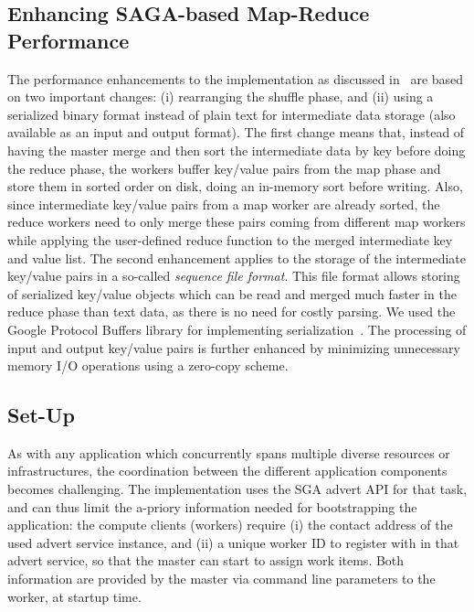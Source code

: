 \documentclass[3p,twocolumn]{elsarticle}
\begin{document}
\subsection{Enhancing SAGA-based Map-Reduce Performance}

The performance enhancements to the \sagamapreduce implementation as
discussed in~\cite{saga_ccgrid09} are based on two important changes:
(i) rearranging the shuffle phase, and (ii) using a serialized binary
format instead of plain text for intermediate data storage (also
available as an input and output format).  The first change means
that, instead of having the master merge and then sort the
intermediate data by key before doing the reduce phase, the workers
buffer key/value pairs from the map phase and store them in sorted
order on disk, doing an in-memory sort before writing. Also, since
intermediate key/value pairs from a map worker are already sorted, the
reduce workers need to only merge these pairs coming from different
map workers while applying the user-defined reduce function to the
merged intermediate key and value list.  The second enhancement
applies to the storage of the intermediate key/value pairs in a
so-called \emph{sequence file format}. This file format allows storing
of serialized key/value objects which can be read and merged much
faster in the reduce phase than text data, as there is no need for
costly parsing.  We used the Google Protocol Buffers library for
implementing serialization~\cite{protobuf}.  The processing of input
and output key/value pairs is further enhanced by minimizing
unnecessary memory I/O operations using a zero-copy scheme.


\subsection{\sagamapreduce Set-Up}

As with any application which concurrently spans multiple diverse
resources or infrastructures, the coordination between the different
application components becomes challenging.  The \smr implementation
uses the SGA advert API for that task, and can thus limit the a-priory
information needed for bootstrapping the application: the compute
clients (workers) require (i) the contact address of the used advert
service instance, and (ii) a unique worker ID to register with in that
advert service, so that the master can start to assign work items.
Both information are provided by the master via command line
parameters to the worker, at startup time.
\end{document}
